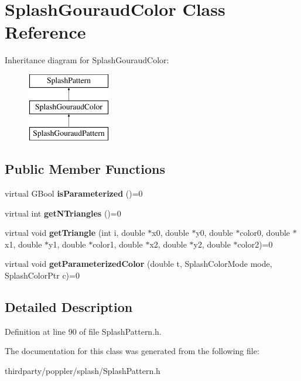 \hypertarget{class_splash_gouraud_color}{}\section{Splash\+Gouraud\+Color Class Reference}
\label{class_splash_gouraud_color}
Inheritance diagram for Splash\+Gouraud\+Color\+:\begin{figure}[H]
\begin{center}
\leavevmode
\includegraphics[height=3.000000cm]{class_splash_gouraud_color}
\end{center}
\end{figure}
\subsection*{Public Member Functions}
\begin{DoxyCompactItemize}
\item 
\mbox{\label{class_splash_gouraud_color_ab50059d05bf23abe60651468654cafe2}} 
virtual G\+Bool {\bfseries is\+Parameterized} ()=0
\item 
\mbox{\label{class_splash_gouraud_color_a305dd2520d24d7e5cc751bfdcb1e4415}} 
virtual int {\bfseries get\+N\+Triangles} ()=0
\item 
\mbox{\label{class_splash_gouraud_color_a371473837935cc1f1171c0cf9f8ca598}} 
virtual void {\bfseries get\+Triangle} (int i, double $\ast$x0, double $\ast$y0, double $\ast$color0, double $\ast$x1, double $\ast$y1, double $\ast$color1, double $\ast$x2, double $\ast$y2, double $\ast$color2)=0
\item 
\mbox{\label{class_splash_gouraud_color_a967f622069a433eee19dcd73f1d2299f}} 
virtual void {\bfseries get\+Parameterized\+Color} (double t, Splash\+Color\+Mode mode, Splash\+Color\+Ptr c)=0
\end{DoxyCompactItemize}


\subsection{Detailed Description}


Definition at line 90 of file Splash\+Pattern.\+h.



The documentation for this class was generated from the following file\+:\begin{DoxyCompactItemize}
\item 
thirdparty/poppler/splash/Splash\+Pattern.\+h\end{DoxyCompactItemize}
